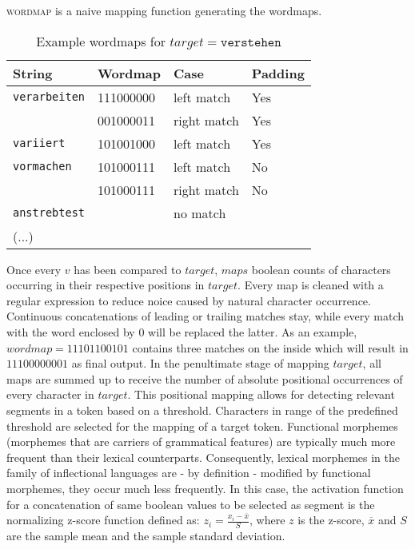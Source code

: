 \textsc{wordmap} is a naive mapping function generating the wordmaps.


\begin{table}
    \centering
    \begin{tabular}{llll}
        \toprule
        \textbf{String} & \textbf{Wordmap} & \textbf{Case} & \textbf{Padding} \\
        \midrule
        \texttt{verarbeiten} & 111000000 & left match & Yes \\
         & 001000011 & right match & Yes \\
        \texttt{variiert} & 101001000 & left match & Yes \\
        \texttt{vormachen} & 101000111 & left match & No \\
        & 101000111 & right match & No \\
        \texttt{anstrebtest} &  & no match &   \\
        (...) &  &  &  \\
        \bottomrule
    \end{tabular}
    \caption{Example wordmaps for $target = \texttt{verstehen}$}
    \label{tab:}
\end{table}

Once every $v$ has been compared to $target$, $maps$ boolean counts of characters occurring in their respective positions in $target$.
Every map is cleaned with a regular expression to reduce noice caused by natural character occurrence.
Continuous concatenations of leading or trailing matches stay, while every match with the word enclosed by $0$ will be replaced the latter.
As an example, $wordmap = 11101100101$ contains three matches on the inside which will result in $11100000001$ as final output.
In the penultimate stage of mapping $target$, all maps are summed up to receive the number of absolute positional occurrences of every character in $target$.
This positional mapping allows for detecting relevant segments in a token based on a threshold.
Characters in range of the predefined threshold are selected for the mapping of a target token.
Functional morphemes (morphemes that are carriers of grammatical features) are typically much more frequent than their lexical counterparts.
Consequently, lexical morphemes in the family of inflectional languages are - by definition - modified by functional morphemes, they occur much less frequently.
In this case, the activation function for a concatenation of same boolean values to be selected as segment is the normalizing z-score function defined as: $z_{i} = \frac{x_{i} - \overline{x}}{S}$,
where $z$ is the z-score, $\overline{x}$ and $S$ are the sample mean and the sample standard deviation.


